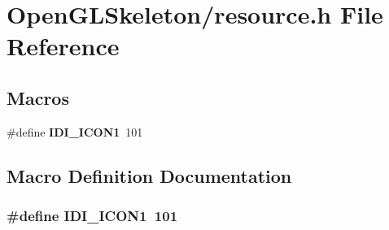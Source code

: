 \section{Open\+G\+L\+Skeleton/resource.h File Reference}
\label{resource_8h}
\subsection*{Macros}
\begin{DoxyCompactItemize}
\item 
\#define {\bf I\+D\+I\+\_\+\+I\+C\+O\+N1}~101
\end{DoxyCompactItemize}


\subsection{Macro Definition Documentation}
\subsubsection[{I\+D\+I\+\_\+\+I\+C\+O\+N1}]{\setlength{\rightskip}{0pt plus 5cm}\#define I\+D\+I\+\_\+\+I\+C\+O\+N1~101}\label{resource_8h_a455fef2a9349aae3af8ef8f24f6fc9d8}
